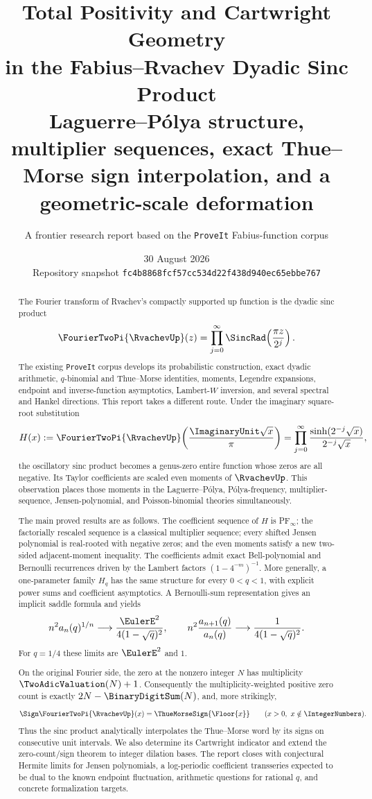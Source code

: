 \documentclass[11pt]{article}
\title{\textbf{Total Positivity and Cartwright Geometry\\in the Fabius--Rvachev Dyadic Sinc Product}\\[0.55em]
\large Laguerre--Pólya structure, multiplier sequences, exact Thue--Morse sign interpolation, and a geometric-scale deformation}
\author{A frontier research report based on the \texttt{ProveIt} Fabius-function corpus}
\date{30 August 2026\\Repository snapshot \texttt{fc4b8868fcf57cc534d22f438d940ec65ebbe767}}
\numberwithin{equation}{section}
\theoremstyle{definition}
\theoremstyle{remark}
\begin{document}
\maketitle

\begin{abstract}
The Fourier transform of Rvachev's compactly supported up function is the dyadic sinc product
\[
 \FourierTwoPi{\RvachevUp}(z)=\prod_{j=0}^{\infty}\SincRad\!\left(\frac{\pi z}{2^j}\right).
\]
The existing \texttt{ProveIt} corpus develops its probabilistic construction, exact dyadic arithmetic, $q$-binomial and Thue--Morse identities, moments, Legendre expansions, endpoint and inverse-function asymptotics, Lambert-$W$ inversion, and several spectral and Hankel directions.  This report takes a different route.  Under the imaginary square-root substitution
\[
 H(x):=\FourierTwoPi{\RvachevUp}\!\left(\frac{\ImaginaryUnit\sqrt{x}}{\pi}\right)
      =\prod_{j=0}^{\infty}\frac{\sinh(2^{-j}\sqrt{x})}{2^{-j}\sqrt{x}},
\]
the oscillatory sinc product becomes a genus-zero entire function whose zeros are all negative.  Its Taylor coefficients are scaled even moments of $\RvachevUp$.  This observation places those moments in the Laguerre--Pólya, Pólya-frequency, multiplier-sequence, Jensen-polynomial, and Poisson-binomial theories simultaneously.

The main proved results are as follows.  The coefficient sequence of $H$ is PF$_\infty$; the factorially rescaled sequence is a classical multiplier sequence; every shifted Jensen polynomial is real-rooted with negative zeros; and the even moments satisfy a new two-sided adjacent-moment inequality.  The coefficients admit exact Bell-polynomial and Bernoulli recurrences driven by the Lambert factors $(1-4^{-m})^{-1}$.  More generally, a one-parameter family $H_q$ has the same structure for every $0<q<1$, with explicit power sums and coefficient asymptotics.  A Bernoulli-sum representation gives an implicit saddle formula and yields
\[
 n^2a_n(q)^{1/n}\longrightarrow \frac{\EulerE^2}{4(1-\sqrt q)^2},
 \qquad
 n^2\frac{a_{n+1}(q)}{a_n(q)}\longrightarrow \frac{1}{4(1-\sqrt q)^2}.
\]
For $q=1/4$ these limits are $\EulerE^2$ and $1$.

On the original Fourier side, the zero at the nonzero integer $N$ has multiplicity $\TwoAdicValuation(N)+1$.  Consequently the multiplicity-weighted positive zero count is exactly $2N-\BinaryDigitSum(N)$, and, more strikingly,
\[
 \Sign\FourierTwoPi{\RvachevUp}(x)=\ThueMorseSign{\Floor{x}}
 \qquad(x>0,\ x\notin\IntegerNumbers).
\]
Thus the sinc product analytically interpolates the Thue--Morse word by its signs on consecutive unit intervals.  We also determine its Cartwright indicator and extend the zero-count/sign theorem to integer dilation bases.  The report closes with conjectural Hermite limits for Jensen polynomials, a log-periodic coefficient transseries expected to be dual to the known endpoint fluctuation, arithmetic questions for rational $q$, and concrete formalization targets.


\end{abstract}
\end{document}
